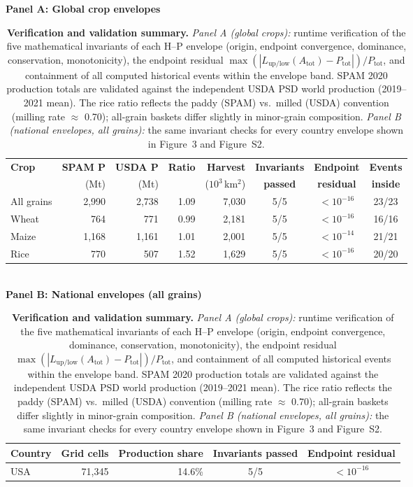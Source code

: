 \begin{table}[H]
    \centering
    \caption{\textbf{Verification and validation summary.}
    \emph{Panel A (global crops):} runtime verification of the five mathematical
    invariants of each H--P envelope (origin, endpoint convergence, dominance,
    conservation, monotonicity), the endpoint residual
    $\max(|L_{\mathrm{up/low}}(A_{\mathrm{tot}}) - P_{\mathrm{tot}}|)/P_{\mathrm{tot}}$,
    and containment of all computed historical events within the envelope band.
    SPAM 2020 production totals are validated against the independent USDA PSD
    world production (2019--2021 mean). The rice ratio reflects the paddy (SPAM)
    vs.\ milled (USDA) convention (milling rate $\approx$ 0.70); all-grain baskets
    differ slightly in minor-grain composition.
    \emph{Panel B (national envelopes, all grains):} the same invariant checks for
    every country envelope shown in Figure~3 and Figure~S2.}
    \label{tab:S2_verification}
    \vspace{0.3cm}
    \textbf{Panel A: Global crop envelopes}\\[0.15cm]
    \begin{tabular}{lrrrrccc}
        \toprule
        \textbf{Crop} & \textbf{SPAM P} & \textbf{USDA P} & \textbf{Ratio} & \textbf{Harvest} & \textbf{Invariants} & \textbf{Endpoint} & \textbf{Events} \\
         & (Mt) & (Mt) &  & ($10^3$\,km$^2$) & \textbf{passed} & \textbf{residual} & \textbf{inside} \\
        \midrule
        All grains & 2,990 & 2,738 & 1.09 & 7,030 & 5/5 & $<10^{-16}$ & 23/23 \\
        Wheat & 764 & 771 & 0.99 & 2,181 & 5/5 & $<10^{-16}$ & 16/16 \\
        Maize & 1,168 & 1,161 & 1.01 & 2,001 & 5/5 & $<10^{-14}$ & 21/21 \\
        Rice & 770 & 507 & 1.52 & 1,629 & 5/5 & $<10^{-16}$ & 20/20 \\
        \bottomrule
    \end{tabular}
    \\[0.4cm]
    \textbf{Panel B: National envelopes (all grains)}\\[0.15cm]
    \begin{tabular}{lrrcc}
        \toprule
        \textbf{Country} & \textbf{Grid cells} & \textbf{Production share} & \textbf{Invariants passed} & \textbf{Endpoint residual} \\
        \midrule
        USA & 71,345 & 14.6\% & 5/5 & $<10^{-16}$ \\

\end{tabular}
\end{table}
